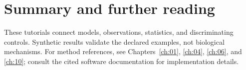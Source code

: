 \section{Summary and further reading}
These tutorials connect models, observations, statistics, and discriminating controls. Synthetic results validate the declared examples, not biological mechanisms. For method references, see Chapters~\ref{ch:01}, \ref{ch:04}, \ref{ch:06}, and \ref{ch:10}; consult the cited software documentation for implementation details.
